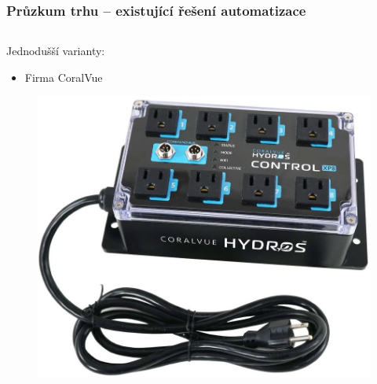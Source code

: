 \documentclass[%
  12pt,       				%
	t,                  %
	aspectratio=1610,   %
	unicode,						%
]{beamer}				    	%
\begin{document}
\begin{frame}[fragile]
	\frametitle{Průzkum trhu -- existující řešení automatizace}
	
	\begin{columns}[T] 								%
		\begin{column}{0.5\textwidth}		%
			Jednodušší varianty:\\[1ex]
			\begin{itemize}
				\item Firma CoralVue
			\end{itemize}

			\vspace{3ex}%
			\begin{figure}%
				\centering
				\vspace{-0.8cm}	              %
				\includegraphics[width=\columnwidth]{obrazky/hydros.jpg}
			\end{figure}
			

\end{column}
\end{columns}
\end{frame}
\end{document}
